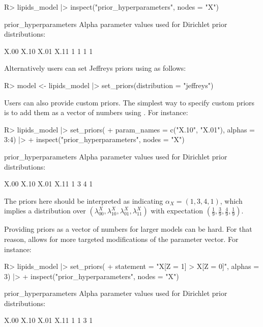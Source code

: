 \documentclass[
  11pt,
  article]{jss}
\renewcommand{\texttt}[1]{\code{#1}}
\begin{document}
\begin{CodeChunk}
\begin{CodeInput}
R> lipids_model |> inspect("prior_hyperparameters", nodes = "X")
\end{CodeInput}

\begin{CodeOutput}

prior_hyperparameters
Alpha parameter values used for Dirichlet prior distributions:

X.00 X.10 X.01 X.11
   1    1    1    1
\end{CodeOutput}
\end{CodeChunk}

Alternatively users can set Jeffreys priors using \texttt{set\_priors()}
as follows:

\begin{CodeInput}
R> model <- lipids_model |> set_priors(distribution = "jeffreys")
\end{CodeInput}

Users can also provide custom priors. The simplest way to specify custom
priors is to add them as a vector of numbers using
\texttt{set\_priors()}. For instance:

\begin{CodeChunk}
\begin{CodeInput}
R> lipids_model |> set_priors(
+    param_names = c("X.10", "X.01"), alphas = 3:4) |>
+    inspect("prior_hyperparameters", nodes = "X")
\end{CodeInput}

\begin{CodeOutput}

prior_hyperparameters
Alpha parameter values used for Dirichlet prior distributions:

X.00 X.10 X.01 X.11
   1    3    4    1
\end{CodeOutput}
\end{CodeChunk}

The priors here should be interpreted as indicating
\(\alpha_X = (1, 3, 4, 1)\), which implies a distribution over
\((\lambda^X_{00},\lambda^X_{10}, \lambda^X_{01}, \lambda^X_{11})\) with
expectation
\(\left(\frac{1}{9}, \frac{3}{9}, \frac{4}{9}, \frac{1}{9} \right)\).

Providing priors as a vector of numbers for larger models can be hard.
For that reason, \texttt{set\_priors()} allows for more targeted
modifications of the parameter vector. For instance:

\begin{CodeChunk}
\begin{CodeInput}
R> lipids_model |> set_priors(
+    statement = "X[Z = 1] > X[Z = 0]", alphas = 3) |>
+    inspect("prior_hyperparameters", nodes = "X")
\end{CodeInput}

\begin{CodeOutput}

prior_hyperparameters
Alpha parameter values used for Dirichlet prior distributions:

X.00 X.10 X.01 X.11
   1    1    3    1
\end{CodeOutput}
\end{CodeChunk}
\end{document}
